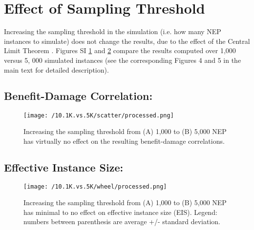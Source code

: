 \documentclass[12pt]{article}	%
\begin{document}
\newpage
\section{Effect of Sampling Threshold}\label{sup_1Kvs5K}
Increasing the sampling threshold in the simulation (i.e. how many NEP instances to simulate) does not change the results, due to the effect of the Central Limit Theorem  \cite{kallenberg_foundations_2006}. Figures SI \ref{supp_1Kvs5K_corr} and \ref{supp_1Kvs5K_wheel} %
compare the results computed over 1,000 versus 5, 000 simulated instances (see the corresponding Figures 4 and 5 in the main text for detailed description).
\subsection{Benefit-Damage Correlation:}

\begin{figure}[H]
		\centering
				\texttt{[image: /10.1K.vs.5K/scatter/processed.png]}
				\caption{Increasing the sampling threshold from (A) 1,000 to (B) 5,000 NEP has virtually no effect on the resulting benefit-damage correlations.}
				\label{supp_1Kvs5K_corr}
\end{figure}

\subsection{Effective Instance Size:}

\begin{figure}[H]
		\centering
				\texttt{[image: /10.1K.vs.5K/wheel/processed.png]}
				\caption{Increasing the sampling threshold from (A) 1,000 to (B) 5,000 NEP has minimal to no effect on effective instance size (EIS). Legend: numbers between parenthesis are average +/- standard deviation. }
				\label{supp_1Kvs5K_wheel}
\end{figure}

\begin{comment}
    \subsection{Gained Benefits:}
    \begin{figure}[H]
    		\centering
    				\texttt{[image: /10.1K.vs.5K/ETX/processed.png]}
    				\caption{Increasing the sampling threshold from (A) 1,000 to (B) 5,000 NEP has minimal to no effect on Gained Benefits (GB).}
    				\label{supp_1Kvs5K_EGB}
    \end{figure}
\end{comment}
\newpage
\end{document}
